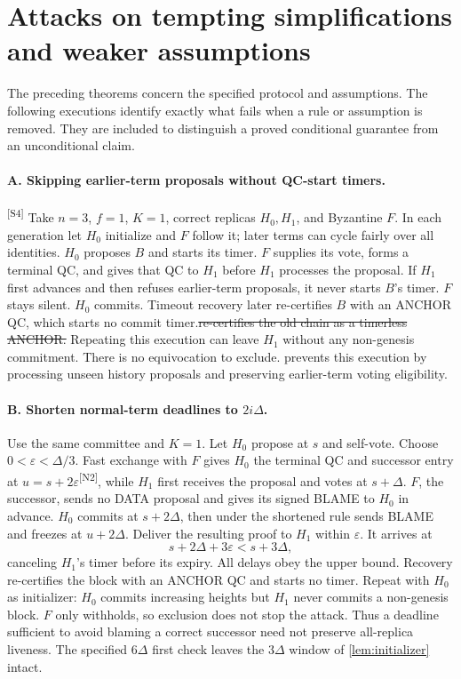 \documentclass[11pt,a4paper]{article}
\newcommand{\NEW}[1]{{\color{diffNew}#1}}
\newcommand{\DEL}[1]{{\color{diffDel}\sout{#1}}}
\newcommand{\CH}[1]{\textsuperscript{\color{diffNew}\sffamily\scriptsize[#1]}}
\newcommand{\NEW}[1]{#1}
\newcommand{\DEL}[1]{}
\newcommand{\CH}[1]{}
\newcounter{protocol}
\begin{document}
\section{Attacks on tempting simplifications and weaker assumptions}
\label{sec:attacks}
The preceding theorems concern the specified protocol and assumptions.
The following executions identify exactly what fails when a rule or
assumption is removed. They are included to distinguish a proved conditional
guarantee from an unconditional claim.

\paragraph{A. \NEW{Skipping earlier-term proposals without QC-start
timers.}}\CH{S4}
Take $n=3$, $f=1$, $K=1$, correct replicas $H_0,H_1$, and Byzantine $F$.
In each generation let $H_0$ initialize and $F$ follow it; later terms
can cycle fairly over all identities. $H_0$ proposes $B$ and starts its
timer. $F$ supplies its vote, forms a terminal QC, and gives that QC to
$H_1$ before $H_1$ processes the proposal. If $H_1$ first advances and
then refuses earlier-term proposals, it never starts $B$'s timer.
$F$ stays silent. $H_0$ commits. Timeout recovery later
\NEW{re-certifies $B$ with an ANCHOR QC, which starts no commit
timer}.\DEL{re-certifies the old chain as a timerless ANCHOR.}
Repeating this execution can leave $H_1$ without any non-genesis
commitment. There is no equivocation to exclude.
 prevents this execution by processing unseen history
proposals and preserving earlier-term voting eligibility.

\paragraph{B. Shorten normal-term deadlines to $2i\Delta$.}
Use the same committee and $K=1$. Let $H_0$ propose at $s$ and self-vote.
Choose $0<\varepsilon<\Delta/3$. Fast exchange with $F$ gives $H_0$ the
terminal QC and successor entry at $u=s+2\varepsilon$\CH{N2}, while $H_1$
first receives the proposal and votes at $s+\Delta$. $F$, the successor,
sends no DATA proposal and \NEW{gives its signed BLAME to $H_0$} in
advance. $H_0$ commits at $s+2\Delta$, then under the shortened rule sends
BLAME and freezes at $u+2\Delta$. Deliver the resulting proof to $H_1$
within $\varepsilon$. It arrives at
\[
 s+2\Delta+3\varepsilon<s+3\Delta,
\]
canceling $H_1$'s timer before its expiry. All delays obey the upper bound.
Recovery \NEW{re-certifies the block with an ANCHOR QC and starts no
timer}. Repeat with $H_0$ as initializer:
$H_0$ commits increasing heights but $H_1$ never commits a non-genesis
block. $F$ only withholds, so exclusion does not stop the attack.
Thus a deadline sufficient to avoid blaming a correct successor need not
preserve all-replica liveness. The specified $6\Delta$ first check leaves
the $3\Delta$ window of \cref{lem:initializer} intact.
\end{document}
